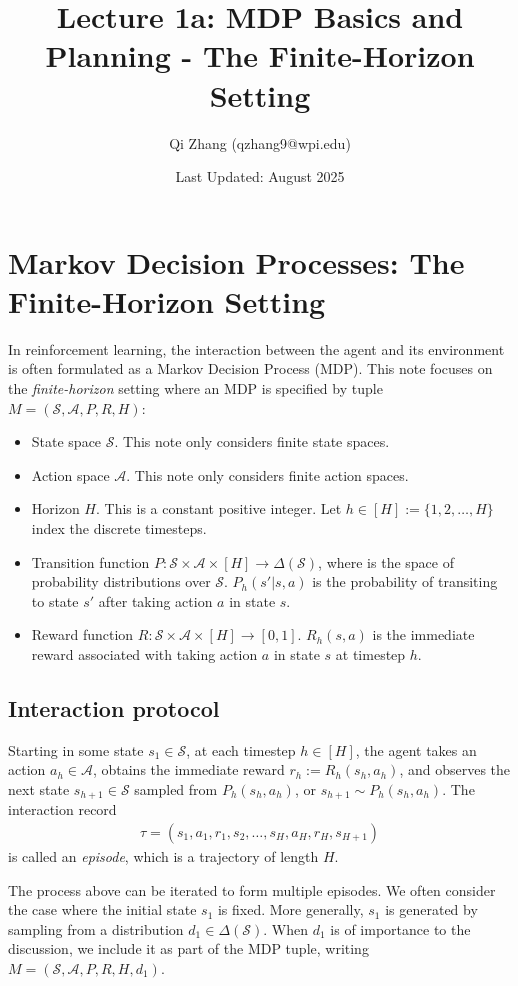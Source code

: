 \title{Lecture 1a: MDP Basics and Planning - The Finite-Horizon Setting}
\author{Qi Zhang (qzhang9@wpi.edu)}
\date{Last Updated: August 2025}

\section{Markov Decision Processes: The Finite-Horizon Setting}
In reinforcement learning, the interaction between the agent and its environment is often formulated as a Markov Decision Process (MDP).
This note focuses on the {\em finite-horizon} setting where an MDP is specified by tuple $M=(\mathcal{S},\mathcal{A}, P, R, H)$:
\begin{itemize}
    \item State space $\mathcal{S}$. This note only considers finite state spaces.
    \item Action space $\mathcal{A}$. This note only considers finite action spaces.
    \item Horizon $H$. This is a constant positive integer. Let $h\in[H]:=\{1,2,\ldots,H\}$ index the discrete timesteps.
    \item Transition function $P:\mathcal{S}\times\mathcal{A}\times[H]\to\Delta(\mathcal{S})$, where is the space of probability distributions over $\mathcal{S}$. $P_h(s'|s,a)$ is the probability of transiting to state $s'$ after taking action $a$ in state $s$.
    \item Reward function $R:\mathcal{S}\times\mathcal{A}\times[H]\to[0,1]$. $R_h(s,a)$ is the  immediate reward associated with taking action $a$ in state $s$ at timestep $h$. 
\end{itemize}

\subsection{Interaction protocol}
Starting in some state $s_1\in\mathcal{S}$, at each timestep $h\in[H]$, the agent takes an action $a_h \in \mathcal{A}$, obtains the immediate reward $r_h:=R_h(s_h, a_h)$, and observes the next state $s_{h+1}\in\mathcal{S}$ sampled from $P_h(s_h, a_h)$, or $s_{h+1} \sim P_h\left(s_h, a_h\right)$. The interaction record
\begin{align*}
    \tau=\left(s_1, a_1, r_1, s_2, \ldots, s_H, a_H, r_H, s_{H+1}\right)
\end{align*}
is called an {\em episode}, which is a trajectory of length $H$.

The process above can be iterated to form multiple episodes. We often consider the case where the initial state $s_1$ is fixed. More generally, $s_1$ is generated by sampling from a distribution $d_1\in \Delta(\mathcal{S})$.
When $d_1$ is of importance to the discussion, we include it as part of the MDP tuple, writing $M=(\mathcal{S},\mathcal{A}, P, R, H, d_1)$.

